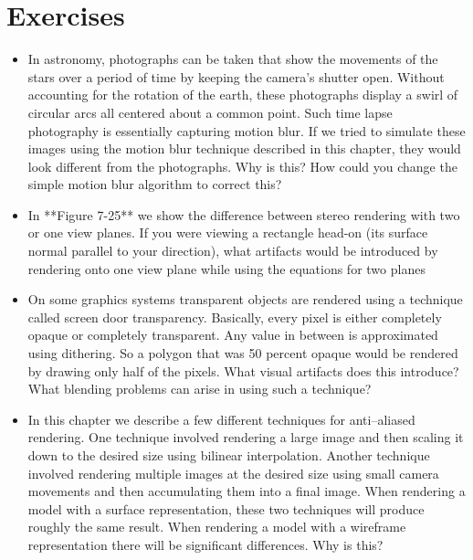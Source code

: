 \printbibliography


\section{Exercises}

\begin{itemize}

\item In astronomy, photographs can be taken that show the movements of the stars over a period of time by keeping the camera's shutter open. Without accounting for the rotation of the earth, these photographs display a swirl of circular arcs all centered about a common point. Such time lapse photography is essentially capturing motion blur. If we tried to simulate these images using the motion blur technique described in this chapter, they would look different from the photographs. Why is this? How could you change the simple motion blur algorithm to correct this?

\item In **Figure 7-25** we show the difference between stereo rendering with two or one view planes. If you were viewing a rectangle head-on (its surface normal parallel to your direction), what artifacts would be introduced by rendering onto one view plane while using the equations for two planes

\item On some graphics systems transparent objects are rendered using a technique called screen door transparency. Basically, every pixel is either completely opaque or completely transparent. Any value in between is approximated using dithering. So a polygon that was 50 percent opaque would be rendered by drawing only half of the pixels. What visual artifacts does this introduce? What blending problems can arise in using such a technique?

\item In this chapter we describe a few different techniques for anti--aliased rendering. One technique involved rendering a large image and then scaling it down to the desired size using bilinear interpolation. Another technique involved rendering multiple images at the desired size using small camera movements and then accumulating them into a final image. When rendering a model with a surface representation, these two techniques will produce roughly the same result. When rendering a model with a wireframe representation there will be significant differences. Why is this?


\end{itemize}
